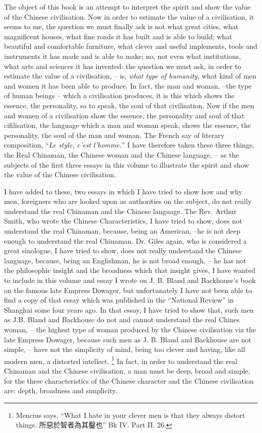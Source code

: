 
The object of this book is an attempt to interpret the spirit and show the value of the Chinese civilisation.
Now in order to estimate the value of a civilisation, it seems to me, the question we must finally ask is not what great cities, what magnificent houses, what fine roads it has built and is able to build;
what beautiful and comfortable furniture,
what clever and useful implements, tools and instruments it has made and is able to make;
no, not even what institutions, what arts and sciences it has invented:
the question we must ask, in order to estimate the value of a civilisation,
-- is, \emph{what type of humanity},
what kind of men and women it has been able to produce.
In fact, the man and woman, --the type of human beings -- which a civilisation produces,
it is this which shows the essence, the personality,
so to speak, the soul of that civilisation.
Now if the men and women of a civilisation show the essence,
the personality and soul of that cifilisation, the language which a man and woman speak, shows the essence, the personality, the soul of the man and woman.
The French say of literary composition, ``\emph{Le style, c'est l'homme.}''
I have therefore taken these three things, the Real Chinaman, the Chinese woman and the Chinese language, -- as the subjects of the first three essays in this volume to illustrate the spirit and show the value of the Chinese civilisation.

I have added to these, two essays in which I have tried to show how and why men, foreigners who are looked upon as authorities on the subject, do not really understand the real Chinaman and the Chinese language. The Rev. Arthur Smith, who wrote the Chinese Characteristics, I have tried to show, does not understand the real Chinaman, because, being an American, --he is not deep enough to understand the real Chinaman. Dr. Giles again, who is considered a great sinologue,
I have tried to show, does not really understand the Chinese language, because, being an Englishman, he is not broad enough, -- he has not the philosophic insight and the broadness which that insight gives, I have wanted to include in this volume and essay I wrote on J. B. Bland and Backhouse's book on the famous late Empress Dowager, but unfortunately I have not been able to find a copy of that essay which was published in the ``National Review'' in Shanghai some four years ago.
In that essay, I have tried to show that, such men as J.B. Bland and Backhouse do not and cannot understand the real Chines woman, -- the highest type of woman produced by the Chinese civilisation viz the late Empress Dowager, because such men as J. B. Bland and Backhouse are not simple, -- have not the simplicity of mind, being too clever and having, like all modern men,
a distorted intellect. \footnote{Mencius says, ``What I hate in your clever men is that they always distort things. 所惡於智者為其鑿也'' Bk IV. Part II. 26.}
In fact, in order to understand the real Chinaman and the Chinese civilisation, a man must be deep, broad and simple, for the three characteristics of the Chinese character and the Chinese civilisation are: depth, broadness and simplicity.

